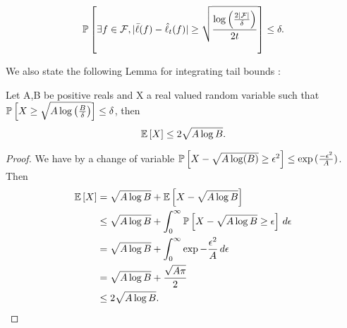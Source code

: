 \begin{solution}[]
\begin{equation*}
	\mathbb{P}\left[\exists f \in \mathcal{F}, |\bar{\ell}(f) - \hat{\ell}_t(f)| \geq \sqrt{\frac{\log \left( \frac{2 |\mathcal{F}|}{\delta} \right)}{2t}}\right] \leq \delta.
\end{equation*}

We also state the following Lemma for integrating tail bounds :
\begin{lemma}
\label{lemma:tail_bounds}
	Let A,B be positive reals and X a real valued random variable such that $ \mathbb{P}\left[X\geq \sqrt{A\log \left(
	\frac{B}{\delta} \right)}\right] \leq \delta $, then
\begin{equation*}
	\mathbb{E}\left[X\right] \leq 2\sqrt{A\log B}.
\end{equation*}

\end{lemma}
\begin{proof}
We have by a change of variable $ \mathbb{P}\left[X- \sqrt{A\log(B)}\geq \epsilon^2\right] \leq \exp{(\frac{-\epsilon^2}{A})}$. Then
\begin{align*}
\mathbb{E}\left[X\right] &= \sqrt{A \log B} + \mathbb{E}\left[X - \sqrt{A \log B}\right]\\
       &\leq \sqrt{A \log B} + \int_{0}^{\infty}\mathbb{P}\left[X - \sqrt{A\log B}\geq \epsilon\right] \,d \epsilon\\
       &= \sqrt{A \log B} + \int_{0}^{\infty}\exp{-\frac{\epsilon^2}{A}}\, d \epsilon \\
       &= \sqrt{A \log B} + \frac{\sqrt{A \pi}}{2} \\
       &\leq 2 \sqrt{A \log B}.
\end{align*}

\end{proof}


\end{solution}
